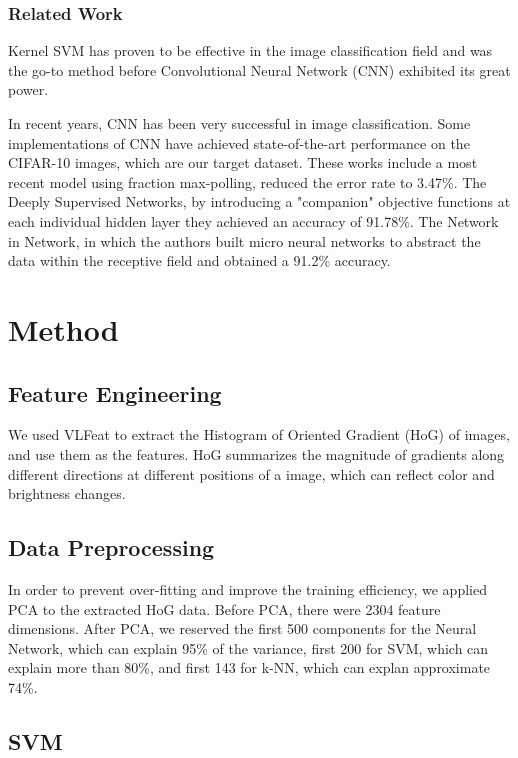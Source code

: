 \documentclass{article} %
\begin{document}
\subsubsection{Related Work}

Kernel SVM has proven to be effective in the image classification field\cite{chapelle1999support} and was the go-to method before Convolutional Neural Network (CNN) exhibited its great power.

In recent years, CNN has been very successful in image classification. Some implementations of CNN have achieved state-of-the-art performance on the CIFAR-10 images, which are our target dataset. These works include a most recent model using fraction max-polling\cite{graham2014fractional}, reduced the error rate to 3.47\%. The Deeply Supervised Networks\cite{lee2014deeply}, by introducing a "companion" objective functions at each individual hidden layer they achieved an accuracy of 91.78\%. The Network in Network\cite{minlin2014network}, in which the authors built micro neural networks to abstract the data within the receptive field and obtained a 91.2\% accuracy.

\section{Method}

\subsection{Feature Engineering}

We used VLFeat to extract the Histogram of Oriented Gradient (HoG) of images, and use them as the features. HoG summarizes the magnitude of gradients along different directions at different positions of a image, which can reflect color and brightness changes.

\subsection{Data Preprocessing}
In order to prevent over-fitting and improve the training efficiency, we applied PCA to the extracted HoG data. Before PCA, there were 2304 feature dimensions. After PCA, we reserved the first 500 components for the Neural Network, which can explain 95\% of the variance, first 200 for SVM, which can explain more than 80\%, and first 143 for k-NN, which can explan approximate 74\%.

\subsection{SVM}
\end{document}
